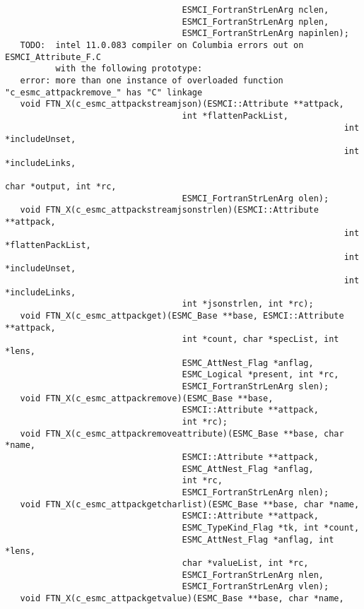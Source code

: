 \begin{verbatim}
                                   ESMCI_FortranStrLenArg nclen,
                                   ESMCI_FortranStrLenArg nplen,
                                   ESMCI_FortranStrLenArg napinlen);
   TODO:  intel 11.0.083 compiler on Columbia errors out on ESMCI_Attribute_F.C
          with the following prototype:
   error: more than one instance of overloaded function "c_esmc_attpackremove_" has "C" linkage
   void FTN_X(c_esmc_attpackstreamjson)(ESMCI::Attribute **attpack,
                                   int *flattenPackList,
                                                                   int *includeUnset,
                                                                   int *includeLinks,
                                                                   char *output, int *rc,
                                   ESMCI_FortranStrLenArg olen);
   void FTN_X(c_esmc_attpackstreamjsonstrlen)(ESMCI::Attribute **attpack,
                                                                   int *flattenPackList,
                                                                   int *includeUnset,
                                                                   int *includeLinks,
                                   int *jsonstrlen, int *rc);
   void FTN_X(c_esmc_attpackget)(ESMC_Base **base, ESMCI::Attribute **attpack,
                                   int *count, char *specList, int *lens,
                                   ESMC_AttNest_Flag *anflag,
                                   ESMC_Logical *present, int *rc,
                                   ESMCI_FortranStrLenArg slen);
   void FTN_X(c_esmc_attpackremove)(ESMC_Base **base,
                                   ESMCI::Attribute **attpack,
                                   int *rc);
   void FTN_X(c_esmc_attpackremoveattribute)(ESMC_Base **base, char *name,
                                   ESMCI::Attribute **attpack,
                                   ESMC_AttNest_Flag *anflag,
                                   int *rc,
                                   ESMCI_FortranStrLenArg nlen);
   void FTN_X(c_esmc_attpackgetcharlist)(ESMC_Base **base, char *name,
                                   ESMCI::Attribute **attpack,
                                   ESMC_TypeKind_Flag *tk, int *count,
                                   ESMC_AttNest_Flag *anflag, int *lens,
                                   char *valueList, int *rc,
                                   ESMCI_FortranStrLenArg nlen,
                                   ESMCI_FortranStrLenArg vlen);
   void FTN_X(c_esmc_attpackgetvalue)(ESMC_Base **base, char *name,

\end{verbatim}
